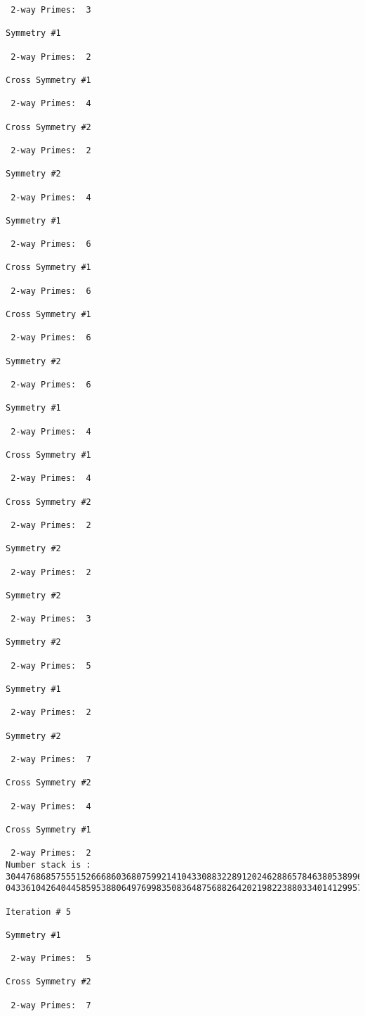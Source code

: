 \begin{verbatim}
 2-way Primes: 	3

Symmetry #1

 2-way Primes: 	2

Cross Symmetry #1

 2-way Primes: 	4

Cross Symmetry #2

 2-way Primes: 	2

Symmetry #2

 2-way Primes: 	4

Symmetry #1

 2-way Primes: 	6

Cross Symmetry #1

 2-way Primes: 	6

Cross Symmetry #1

 2-way Primes: 	6

Symmetry #2

 2-way Primes: 	6

Symmetry #1

 2-way Primes: 	4

Cross Symmetry #1

 2-way Primes: 	4

Cross Symmetry #2

 2-way Primes: 	2

Symmetry #2

 2-way Primes: 	2

Symmetry #2

 2-way Primes: 	3

Symmetry #2

 2-way Primes: 	5

Symmetry #1

 2-way Primes: 	2

Symmetry #2

 2-way Primes: 	7

Cross Symmetry #2

 2-way Primes: 	4

Cross Symmetry #1

 2-way Primes: 	2
Number stack is :
30447686857555152666860368075992141043308832289120246288657846380538996794608835958544046240163340857
04336104264044585953880649769983508364875688264202198223880334014129957086306866625155575868674403758

Iteration #	5

Symmetry #1

 2-way Primes: 	5

Cross Symmetry #2

 2-way Primes: 	7


\end{verbatim}
